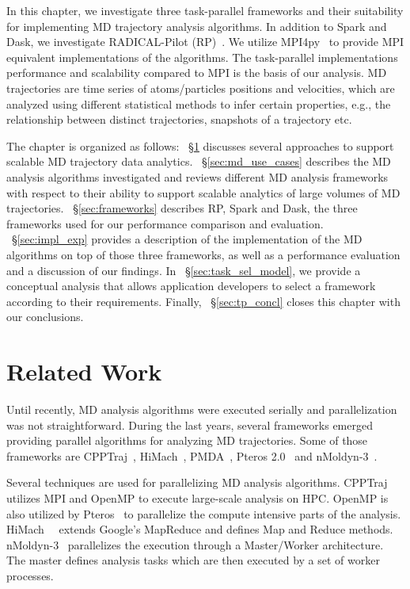 In this chapter, we investigate three task-parallel frameworks and their
suitability for implementing MD trajectory analysis algorithms. In addition to
Spark and Dask, we investigate RADICAL-Pilot (RP)~\cite{merzky2019using}. We utilize
MPI4py~\cite{dalcin2005mpi} to provide MPI equivalent implementations of the
algorithms. The task-parallel implementations performance and scalability
compared to MPI is the basis of our analysis. MD trajectories are time series of
atoms/particles positions and velocities, which are analyzed using different
statistical methods to infer certain properties, e.g., the relationship between
distinct trajectories, snapshots of a trajectory etc.

The chapter is organized as follows: ~\S\ref{sec:tp_related_work} discusses
several approaches to support scalable MD trajectory data analytics.
~\S\ref{sec:md_use_cases} describes the MD analysis algorithms investigated
and reviews different MD analysis frameworks with respect to their ability to
support scalable analytics of large volumes of MD trajectories.
~\S\ref{sec:frameworks} describes RP, Spark and  Dask, the three
frameworks used for our performance comparison and evaluation.
~\S\ref{sec:impl_exp} provides a description of the implementation of the
MD algorithms on top of those three frameworks, as well as a performance
evaluation and a discussion of our findings. In
~\S\ref{sec:task_sel_model}, we provide a conceptual analysis that allows
application developers to select a framework according to their requirements.
Finally, ~\S\ref{sec:tp_concl} closes this chapter with our conclusions.


\section{Related Work}
\label{sec:tp_related_work}

Until recently, MD analysis algorithms were executed serially and
parallelization was not straightforward. During the last years, several
frameworks emerged providing parallel algorithms for analyzing MD trajectories.
Some of those frameworks are CPPTraj~\cite{roe2013ptraj,roe2018parallelization},
HiMach~\cite{tiankai2008scalable}, PMDA~\cite{fan2019pmda}, Pteros
2.0~\cite{yesylevskyy2015pteros} and nMoldyn-3~\cite{hinsen2012nmoldyn}.

Several techniques are used for parallelizing MD analysis algorithms.
CPPTraj~\cite{roe2018parallelization} utilizes MPI and OpenMP to execute
large-scale analysis on HPC. OpenMP is also utilized by
Pteros~\cite{yesylevskyy2015pteros} to parallelize the compute intensive parts
of the analysis. HiMach~~\cite{tiankai2008scalable} extends Google's MapReduce
and defines Map and Reduce methods. nMoldyn-3~\cite{hinsen2012nmoldyn}
parallelizes the execution through a Master/Worker architecture. The master
defines analysis tasks which are then executed by a set of worker processes.

